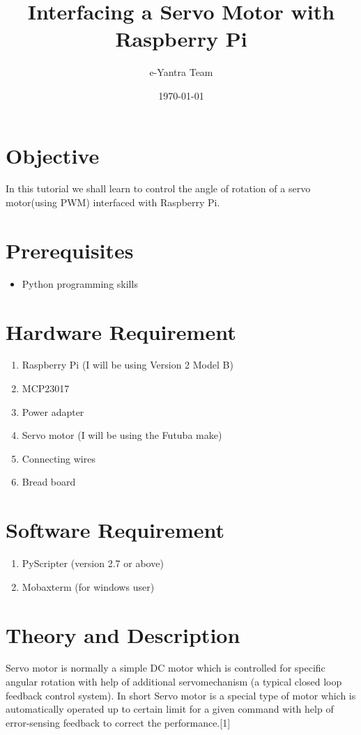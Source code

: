 \documentclass[11pt,a4paper]{article}
\title{Interfacing a Servo Motor with Raspberry Pi}
\author{e-Yantra Team}
\date{\today}
\begin{document}
	\maketitle
	\newpage
	\tableofcontents
	\newpage
	
	\section{Objective}
	In this tutorial we shall learn to control the angle of rotation of a servo motor(using PWM) interfaced with Raspberry Pi. 
	
	\section{Prerequisites}
	\begin{itemize}
		\item Python programming skills
    \end{itemize}
	
	\section{Hardware Requirement}
	\begin{enumerate}
		\item Raspberry Pi (I will be using Version 2 Model B)
		\item MCP23017
		\item Power adapter
		\item Servo motor (I will be using the Futuba make)
		\item Connecting wires
		\item Bread board
	\end{enumerate}
	
	\section{Software Requirement}
	\begin{enumerate}
		\item PyScripter (version 2.7 or above)
		\item Mobaxterm (for windows user)
	\end{enumerate}
	
	\newpage
	\section{Theory and Description}
	Servo motor is normally a simple DC motor which is controlled for specific angular rotation with help of additional servomechanism (a typical closed loop feedback control system). 
	\newline
	In short Servo motor is a special type of motor which is automatically operated up to certain limit for a given command with help of error-sensing feedback to correct the performance.[1]
	
\end{document}
